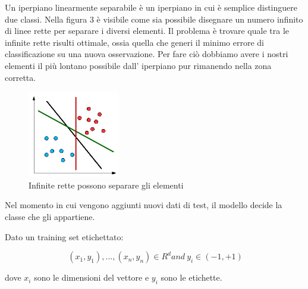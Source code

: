 \documentclass[12pt,italian]{report}
\begin{document}
Un iperpiano linearmente separabile è un iperpiano in cui è semplice distinguere due classi. Nella figura 3 è visibile come sia possibile disegnare un numero infinito di linee rette per separare i diversi elementi. Il problema è trovare quale tra le infinite rette risulti ottimale, ossia quella che generi il minimo errore di classificazione su una nuova osservazione.
Per fare ciò dobbiamo avere i nostri elementi il più lontano possibile dall' iperpiano pur rimanendo nella zona corretta. 
\begin{figure}[h]
	\centering
	\includegraphics[width = 40mm]{immagini/linearmente-separabili}
	\caption{Infinite rette possono separare gli elementi}
\end{figure}

Nel momento in cui vengono aggiunti nuovi dati di test, il modello decide la classe che gli appartiene.

Dato un training set etichettato:

\begin{center}
	\[
	\ (x_1, y_1), ..., (x_n, y_n) \in R^{d} and 
	\ y_i \in (-1, +1)
	\]
\end{center}
dove $x_i$ sono le dimensioni del vettore e $y_i$ sono le etichette.
\end{document}
